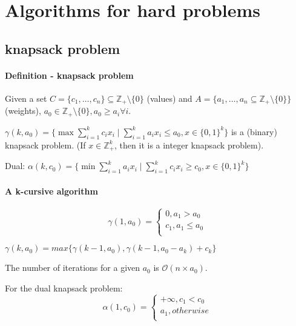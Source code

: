 \documentclass[main]{subfiles}
\begin{document}

\section{Algorithms for hard problems}

\subsection{knapsack problem}
\paragraph{Definition - knapsack problem}

Given a set $C = \{ c_{1}, \dots, c_{n} \} \subseteq \mathbb{Z}_{+} \setminus \{ 0\}$ (values) and $A = \{a_{1}, \dots, a_{n} \subseteq \mathbb{Z}_{+} \setminus \{ 0\} \}$ (weights), $a_{0} \in \mathbb{Z}_{+} \setminus \{ 0\}, a_{0} \geq a_{i} \forall i$.

$\gamma(k, a_{0}) = \{ \max \sum_{i =1}^{k} c_{i} x_{i} \mid \sum_{i=1}^{k} a_{i}x_{i} \leq a_{0}, x \in \{0,1\}^{k} \}$ is a (binary) knapsack problem. (If $x \in \mathbb{Z}_{+}^{k}$, then it is a integer knapsack problem).

Dual:
$\alpha(k, c_{0}) = \{ \min \sum_{i =1}^{k} a_{i} x_{i} \mid \sum_{i=1}^{k} c_{i}x_{i} \geq c_{0}, x \in \{0,1\}^{k} \}$

\paragraph{A k-cursive algorithm}

\[
  \gamma(1, a_{0})=\begin{cases}
               0, a_{1} > a_{0}\\
               c_{1}, a_{1} \leq a_{0}\\
            \end{cases}
\]

$\gamma(k, a_{0}) = max\{\gamma(k-1, a_{0}), \gamma(k-1, a_{0} - a_{k}) + c_{k}\}$

The number of iterations for a given $a_{0}$ is $\mathcal{O}(n \times a_{0})$.

For the dual knapsack problem:
\[
  \alpha(1, c_{0})=\begin{cases}
               +\infty, c_{1} < c_{0}\\
               a_{1}, otherwise\\
            \end{cases}
\]
\end{document}
